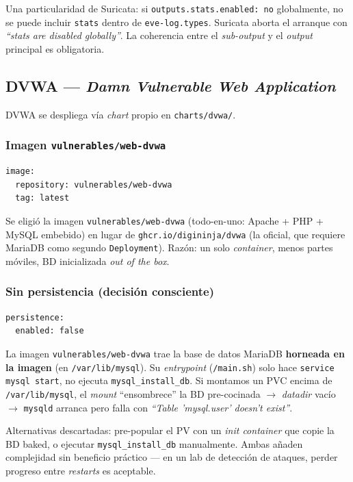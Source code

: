 Una particularidad de Suricata: si \texttt{outputs.stats.enabled: no} globalmente, no se puede incluir \texttt{stats} dentro de \texttt{eve-log.types}. Suricata aborta el arranque con \emph{``stats are disabled globally''}. La coherencia entre el \emph{sub-output} y el \emph{output} principal es obligatoria.

\subsection{DVWA --- \emph{Damn Vulnerable Web Application}}

DVWA se despliega vía \emph{chart} propio en \texttt{charts/dvwa/}.

\subsubsection{Imagen \texttt{vulnerables/web-dvwa}}

\begin{lstlisting}[style=yaml]
image:
  repository: vulnerables/web-dvwa
  tag: latest
\end{lstlisting}

Se eligió la imagen \texttt{vulnerables/web-dvwa} (todo-en-uno: Apache + PHP + MySQL embebido) en lugar de \texttt{ghcr.io/digininja/dvwa} (la oficial, que requiere MariaDB como segundo \texttt{Deployment}). Razón: un solo \emph{container}, menos partes móviles, BD inicializada \emph{out of the box}.

\subsubsection{Sin persistencia (decisión consciente)}

\begin{lstlisting}[style=yaml]
persistence:
  enabled: false
\end{lstlisting}

La imagen \texttt{vulnerables/web-dvwa} trae la base de datos MariaDB \textbf{horneada en la imagen} (en \texttt{/var/lib/mysql}). Su \emph{entrypoint} (\texttt{/main.sh}) solo hace \texttt{service mysql start}, no ejecuta \texttt{mysql\_install\_db}. Si montamos un PVC encima de \texttt{/var/lib/mysql}, el \emph{mount} ``ensombrece'' la BD pre-cocinada $\to$ \emph{datadir} vacío $\to$ \texttt{mysqld} arranca pero falla con \emph{``Table 'mysql.user' doesn't exist''}.

Alternativas descartadas: pre-popular el PV con un \emph{init container} que copie la BD baked, o ejecutar \texttt{mysql\_install\_db} manualmente. Ambas añaden complejidad sin beneficio práctico --- en un lab de detección de ataques, perder progreso entre \emph{restarts} es aceptable.

